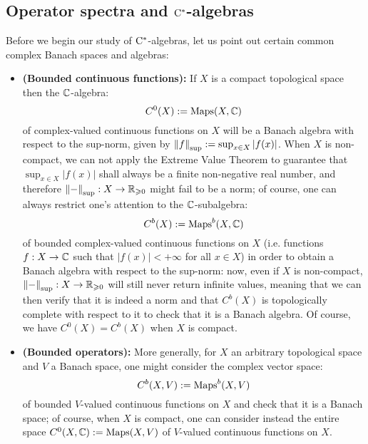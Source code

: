     \subsection{Operator spectra and \texorpdfstring{$\mathrm{C}^*$}{}-algebras}
        \begin{example}
            Before we begin our study of $\mathrm{C}^*$-algebras, let us point out certain common complex Banach spaces and algebras:
            \begin{itemize}
                \item \textbf{(Bounded continuous functions):} If $X$ is a compact topological space then the $\mathbb{C}$-algebra:
                    $$C^0(X) := \mathrm{Maps}(X, \mathbb{C})$$
                of complex-valued continuous functions on $X$ will be a Banach algebra with respect to the sup-norm, given by $\left\| {f} \right\|_{\sup} := \sup_{x \in X} |f(x)|$. When $X$ is non-compact, we can not apply the Extreme Value Theorem to guarantee that $\sup_{x \in X} |f(x)|$ shall always be a finite non-negative real number, and therefore $\left\| {-} \right\|_{\sup}: X \to \mathbb{R}_{\geqslant 0}$ might fail to be a norm; of course, one can always restrict one's attention to the $\mathbb{C}$-subalgebra:
                    $$C^b(X) := \mathrm{Maps}^b(X, \mathbb{C})$$
                of bounded complex-valued continuous functions on $X$ (i.e. functions $f: X \to \mathbb{C}$ such that $|f(x)| < +\infty$ for all $x \in X$) in order to obtain a Banach algebra with respect to the sup-norm: now, even if $X$ is non-compact, $\left\| {-} \right\|_{\sup}: X \to \mathbb{R}_{\geqslant 0}$ will still never return infinite values, meaning that we can then verify that it is indeed a norm and that $C^b(X)$ is topologically complete with respect to it to check that it is a Banach algebra. Of course, we have $C^0(X) = C^b(X)$ when $X$ is compact. 
                \item \textbf{(Bounded operators):} More generally, for $X$ an arbitrary topological space and $V$ a Banach space, one might consider the complex vector space:
                    $$C^b(X, V) := \mathrm{Maps}^b(X, V)$$
                of bounded $V$-valued continuous functions on $X$ and check that it is a Banach space; of course, when $X$ is compact, one can consider instead the entire space $C^0(X, \mathbb{C}) := \mathrm{Maps}(X, V)$ of $V$-valued continuous functions on $X$.
                

\end{itemize}
\end{example}
